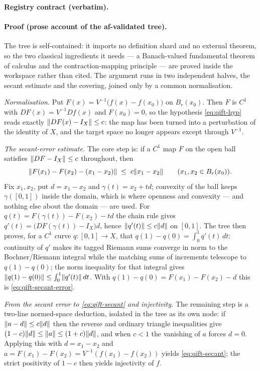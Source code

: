 \noindent\textbf{Registry contract (verbatim).}

\paragraph{Proof (prose account of the af-validated tree).}
The tree is self-contained: it imports no definition shard and no external theorem, so the
two classical ingredients it needs --- a Banach-valued fundamental theorem of calculus and
the contraction-mapping principle --- are proved inside the workspace rather than cited.
The argument runs in two independent halves, the secant estimate and the covering, joined
only by a common normalisation.

\emph{Normalisation.} Put $F(x)=V^{-1}\bigl(f(x)-f(x_0)\bigr)$ on $B_r(x_0)$. Then $F$ is
$C^{1}$ with $DF(x)=V^{-1}Df(x)$ and $F(x_0)=0$, so the hypothesis \eqref{eq:qift-hyp}
reads exactly $\lVert DF(x)-I_X\rVert\le c$: the map has been turned into a perturbation of the
identity of $X$, and the target space no longer appears except through $V^{-1}$.

\emph{The secant-error estimate.} The core step is: if a $C^{1}$ map $F$ on the open ball
satisfies $\lVert DF-I_X\rVert\le c$ throughout, then
\begin{equation}\label{eq:qift-secant-error}
  \lVert F(x_1)-F(x_2)-(x_1-x_2)\rVert\;\le\;c\lVert x_1-x_2\rVert
  \qquad (x_1,x_2\in B_r(x_0)).
\end{equation}
Fix $x_1,x_2$, put $d=x_1-x_2$ and $\gamma(t)=x_2+td$; convexity of the ball keeps
$\gamma([0,1])$ inside the domain, which is where openness and convexity --- and nothing
else about the domain --- are used. For $q(t)=F(\gamma(t))-F(x_2)-td$ the chain rule gives
$q'(t)=\bigl(DF(\gamma(t))-I_X\bigr)d$, hence $\lVert q'(t)\rVert\le c\lVert d\rVert$ on $[0,1]$. The
tree then proves, for a $C^{1}$ curve $q:[0,1]\to X$, that
$q(1)-q(0)=\int_0^1q'(t)\,dt$: continuity of $q'$ makes its tagged Riemann sums converge in
norm to the Bochner/Riemann integral while the matching sums of increments telescope to
$q(1)-q(0)$; the norm inequality for that integral gives
$\lVert q(1)-q(0)\rVert\le\int_0^1\lVert q'(t)\rVert\,dt$. With $q(1)-q(0)=F(x_1)-F(x_2)-d$ this is
\eqref{eq:qift-secant-error}.

\emph{From the secant error to \eqref{eq:qift-secant} and injectivity.} The remaining step
is a two-line normed-space deduction, isolated in the tree as its own node: if
$\lVert a-d\rVert\le c\lVert d\rVert$ then the reverse and ordinary triangle inequalities give
$(1-c)\lVert d\rVert\le\lVert a\rVert\le(1+c)\lVert d\rVert$, and when $c<1$ the vanishing of $a$ forces $d=0$.
Applying this with $d=x_1-x_2$ and $a=F(x_1)-F(x_2)=V^{-1}(f(x_1)-f(x_2))$ yields
\eqref{eq:qift-secant}; the strict positivity of $1-c$ then yields injectivity of $f$.

